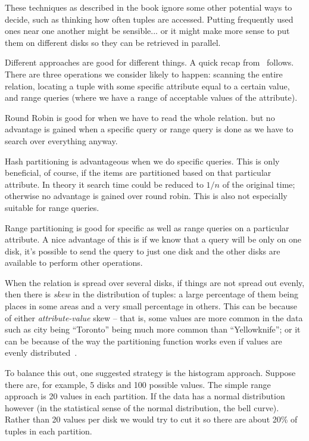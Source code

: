 These techniques as described in the book ignore some other potential ways to decide, such as thinking how often tuples are accessed. Putting frequently used ones near one another might be sensible... or it might make more sense to put them on different disks so they can be retrieved in parallel.

Different approaches are good for different things. A quick recap from~\cite{dsc} follows. There are three operations we consider likely to happen: scanning the entire relation, locating a tuple with some specific attribute equal to a certain value, and range queries (where we have a range of acceptable values of the attribute).

Round Robin is good for when we have to read the whole relation. but no advantage is gained when a specific query or range query is done as we have to search over everything anyway.

Hash partitioning is advantageous when we do specific queries. This is only beneficial, of course, if the items are partitioned based on that particular attribute. In theory it search time could be reduced to $1/n$ of the original time; otherwise no advantage is gained over round robin. This is also not especially suitable for range queries.

Range partitioning is good for specific as well as range queries on a particular attribute. A nice advantage of this is if we know that a query will be only on one disk, it's possible to send the query to just one disk and the other disks are available to perform other operations.

When the relation is spread over several disks, if things are not spread out evenly, then there is \textit{skew} in the distribution of tuples: a large percentage of them being places in some areas and a very small percentage in others. This can be because of either \textit{attribute-value} skew -- that is, some values are more common in the data such as city being ``Toronto'' being much more common than ``Yellowknife''; or it can be because of the way the partitioning function works even if values are evenly distributed~\cite{dsc}.

To balance this out, one suggested strategy is the histogram approach. Suppose there are, for example, 5 disks and 100 possible values. The simple range approach is 20 values in each partition. If the data has a normal distribution however (in the statistical sense of the normal distribution, the bell curve). Rather than 20 values per disk we would try to cut it so there are about 20\% of tuples in each partition.

